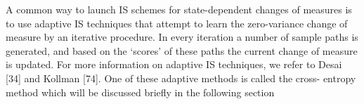 A common way to
launch IS schemes for state-dependent changes of measures is to use adaptive IS techniques
that attempt to learn the zero-variance change of measure by an iterative procedure.  In every
iteration a number of sample paths is generated,  and based on the ‘scores’ of these paths
the current change of measure is updated.  For more information on adaptive IS techniques,
we refer to Desai [34] and Kollman [74].  One of these adaptive methods is called the cross-
entropy method which will be discussed briefly in the following section


%
